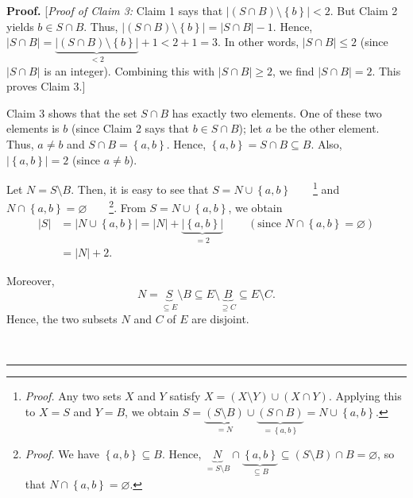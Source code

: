 \documentclass[numbers=enddot,12pt,final,onecolumn,notitlepage]{scrartcl}%
\theoremstyle{definition}
\newenvironment{proof}[1][Proof]{\noindent\textbf{#1.} }{\ \rule{0.5em}{0.5em}}
\renewcommand{\leq}{\leqslant}
\renewcommand{\geq}{\geqslant}
\theoremstyle{plainsl}
\begin{document}
\begin{proof}
[\textit{Proof of Claim 3:} Claim 1 says that $\left\vert \left(  S\cap
B\right)  \setminus\left\{  b\right\}  \right\vert <2$. But Claim 2 yields
$b\in S\cap B$. Thus, $\left\vert \left(  S\cap B\right)  \setminus\left\{
b\right\}  \right\vert =\left\vert S\cap B\right\vert -1$. Hence, $\left\vert
S\cap B\right\vert =\underbrace{\left\vert \left(  S\cap B\right)
\setminus\left\{  b\right\}  \right\vert }_{<2}+1<2+1=3$. In other words,
$\left\vert S\cap B\right\vert \leq2$ (since $\left\vert S\cap B\right\vert $
is an integer). Combining this with $\left\vert S\cap B\right\vert \geq2$, we
find $\left\vert S\cap B\right\vert =2$. This proves Claim 3.] \medskip

Claim 3 shows that the set $S\cap B$ has exactly two elements. One of these
two elements is $b$ (since Claim 2 says that $b\in S\cap B$); let $a$ be the
other element. Thus, $a\neq b$ and $S\cap B=\left\{  a,b\right\}  $. Hence,
$\left\{  a,b\right\}  =S\cap B\subseteq B$. Also, $\left\vert \left\{
a,b\right\}  \right\vert =2$ (since $a\neq b$).

Let $N=S\setminus B$. Then, it is easy to see that $S=N\cup\left\{
a,b\right\}  $\ \ \ \ \footnote{\textit{Proof.} Any two sets $X$ and $Y$
satisfy $X=\left(  X\setminus Y\right)  \cup\left(  X\cap Y\right)  $.
Applying this to $X=S$ and $Y=B$, we obtain $S=\underbrace{\left(  S\setminus
B\right)  }_{=N}\cup\underbrace{\left(  S\cap B\right)  }_{=\left\{
a,b\right\}  }=N\cup\left\{  a,b\right\}  $.} and $N\cap\left\{  a,b\right\}
=\varnothing$\ \ \ \ \footnote{\textit{Proof.} We have $\left\{  a,b\right\}
\subseteq B$. Hence, $\underbrace{N}_{=S\setminus B}\cap\underbrace{\left\{
a,b\right\}  }_{\subseteq B}\subseteq\left(  S\setminus B\right)  \cap
B=\varnothing$, so that $N\cap\left\{  a,b\right\}  =\varnothing$.}. From
$S=N\cup\left\{  a,b\right\}  $, we obtain
\begin{align}
\left\vert S\right\vert  &  =\left\vert N\cup\left\{  a,b\right\}  \right\vert
=\left\vert N\right\vert +\underbrace{\left\vert \left\{  a,b\right\}
\right\vert }_{=2}\ \ \ \ \ \ \ \ \ \ \left(  \text{since }N\cap\left\{
a,b\right\}  =\varnothing\right) \nonumber\\
&  =\left\vert N\right\vert +2. \label{pf.thm.converse-strong.4}%
\end{align}


Moreover,
\[
N=\underbrace{S}_{\subseteq E}\setminus B\subseteq E\setminus\underbrace{B}%
_{\supseteq C}\subseteq E\setminus C.
\]
Hence, the two subsets $N$ and $C$ of $E$ are disjoint.


\end{proof}
\end{document}
